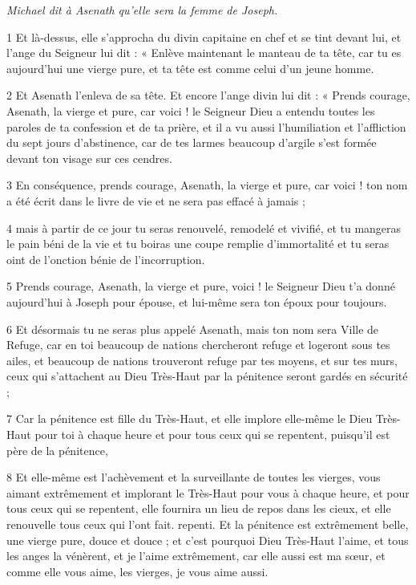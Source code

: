 
\par \textit{Michael dit à Asenath qu'elle sera la femme de Joseph.}

\par 1 Et là-dessus, elle s'approcha du divin capitaine en chef et se tint devant lui, et l'ange du Seigneur lui dit : « Enlève maintenant le manteau de ta tête, car tu es aujourd'hui une vierge pure, et ta tête est comme celui d’un jeune homme.

\par 2 Et Asenath l'enleva de sa tête. Et encore l'ange divin lui dit : « Prends courage, Asenath, la vierge et pure, car voici ! le Seigneur Dieu a entendu toutes les paroles de ta confession et de ta prière, et il a vu aussi l'humiliation et l'affliction du sept jours d'abstinence, car de tes larmes beaucoup d'argile s'est formée devant ton visage sur ces cendres.

\par 3 En conséquence, prends courage, Asenath, la vierge et pure, car voici ! ton nom a été écrit dans le livre de vie et ne sera pas effacé à jamais ;

\par 4 mais à partir de ce jour tu seras renouvelé, remodelé et vivifié, et tu mangeras le pain béni de la vie et tu boiras une coupe remplie d'immortalité et tu seras oint de l'onction bénie de l'incorruption.

\par 5 Prends courage, Asenath, la vierge et pure, voici ! le Seigneur Dieu t'a donné aujourd'hui à Joseph pour épouse, et lui-même sera ton époux pour toujours.

\par 6 Et désormais tu ne seras plus appelé Asenath, mais ton nom sera Ville de Refuge, car en toi beaucoup de nations chercheront refuge et logeront sous tes ailes, et beaucoup de nations trouveront refuge par tes moyens, et sur tes murs, ceux qui s'attachent au Dieu Très-Haut par la pénitence seront gardés en sécurité ;

\par 7 Car la pénitence est fille du Très-Haut, et elle implore elle-même le Dieu Très-Haut pour toi à chaque heure et pour tous ceux qui se repentent, puisqu'il est père de la pénitence,

\par 8 Et elle-même est l'achèvement et la surveillante de toutes les vierges, vous aimant extrêmement et implorant le Très-Haut pour vous à chaque heure, et pour tous ceux qui se repentent, elle fournira un lieu de repos dans les cieux, et elle renouvelle tous ceux qui l'ont fait. repenti. Et la pénitence est extrêmement belle, une vierge pure, douce et douce ; et c'est pourquoi Dieu Très-Haut l'aime, et tous les anges la vénèrent, et je l'aime extrêmement, car elle aussi est ma sœur, et comme elle vous aime, les vierges, je vous aime aussi.

